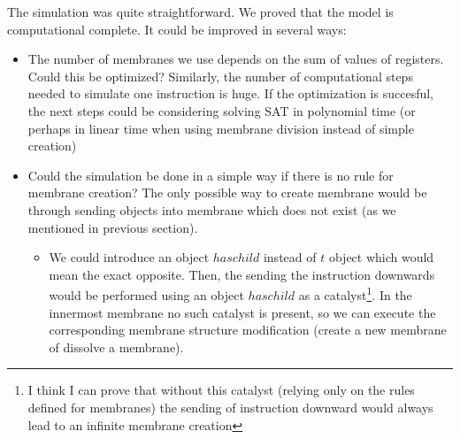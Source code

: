 \documentclass[llncs,submission,copyright,creativecommons]{../lib/lncs/llncs}
\begin{document}
The simulation was quite straightforward. We proved that the model is computational complete. It could be improved in several ways:
\begin{itemize}
  \item The number of membranes we use depends on the sum of values of registers. Could this be optimized? Similarly, the number of computational steps needed to simulate one instruction is huge. If the optimization is succesful, the next steps could be considering solving SAT in polynomial time (or perhaps in linear time when using membrane division instead of simple creation) 
  \item Could the simulation be done in a simple way if there is no rule for membrane creation? The only possible way to create membrane would be through sending objects into membrane which does not exist (as we mentioned in previous section).
  \begin{itemize}
    \item We could introduce an object $haschild$ instead of $t$ object which would mean the exact opposite. Then, the sending the instruction downwards would be performed using an object $haschild$ as a catalyst\footnote{I think I can prove that without this catalyst (relying only on the rules defined for membranes) the sending of instruction downward would always lead to an infinite membrane creation}. In the innermost membrane no such catalyst is present, so we can execute the corresponding membrane structure modification (create a new membrane of dissolve a membrane).
  \end{itemize}
\end{itemize}







\end{document}
